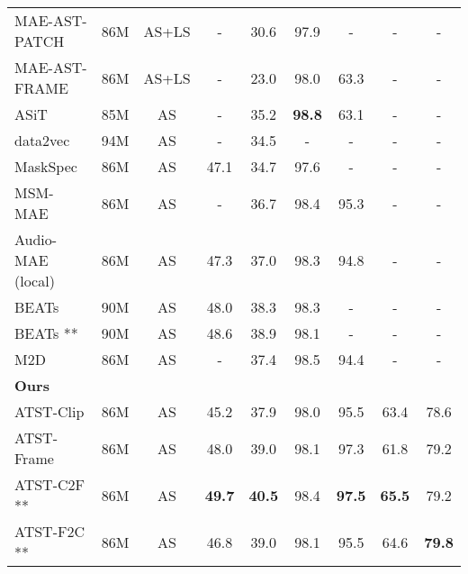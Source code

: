 \begin{table*}[ht]
{\begin{threeparttable}
\begin{tabular}{lcccccccc}
        MAE-AST-PATCH\cite{baade_mae-ast_2022}    &86M & AS+LS   & -               & 30.6 & 97.9   & -   & -  & -    \\
        MAE-AST-FRAME\cite{baade_mae-ast_2022}    &86M & AS+LS   & -               & 23.0 & 98.0   & 63.3   & -  & -   \\
        ASiT\cite{atito_asit_2022}                      &85M & AS      & -               & 35.2 & \textbf{98.8}   & 63.1  & -   & -     \\
        data2vec\cite{baevski_data2vec_2022} & 94M & AS & -&34.5&-&-&- & -\\
        MaskSpec\cite{10095691}  & 86M & AS & 47.1 & 34.7 & 97.6 & - & - & -  \\
        MSM-MAE\cite{niizumi_masked_nodate}  & 86M & AS & - & 36.7 & 98.4 & 95.3 &  -  & - \\

        Audio-MAE (local) \cite{huang_masked_2023} &86M & AS      & 47.3            & 37.0 & 98.3   & 94.8   & - & -     \\
        BEATs \cite{chen_beats_2022}          & 90M& AS      & 48.0            & 38.3 & 98.3   & -      & -   & -  \\        
       
                       BEATs \cite{chen_beats_2022} **          & 90M& AS      & 48.6            & 38.9 & 98.1  & -      & -   & -   \\
        M2D\cite{niizumi_masked_2023}                   & 86M & AS      & -               & 37.4 & 98.5   & 94.4   & -  & -  \\

        \midrule

\multicolumn{5}{l}{\textbf{Ours} } \\                              
        {ATST-Clip }              & 86M         & AS      & 45.2            & 37.9 & 98.0   & 95.5   & 63.4 & 78.6 
        \\
\vspace{1mm}
        {ATST-Frame }             &   86M       & AS      & 48.0            &39.0 & 98.1   & 97.3   & 61.8 & 79.2 \\
        
        


    
         
         {ATST-C2F} ** &86M & AS & \bf{49.7} & \bf{40.5} & 98.4& \bf{97.5} & \bf{65.5} & 79.2  \\
         
        \textcolor{mygray}{ATST-F2C **}  &\textcolor{mygray}{86M} & \textcolor{mygray}{AS} & \textcolor{mygray}{46.8} & \textcolor{mygray}{39.0} & \textcolor{mygray}{98.1}& \textcolor{mygray}{95.5} & \textcolor{mygray}{64.6} & \textcolor{mygray}{\bf{79.8}}  \\
       



\end{tabular}
\end{threeparttable}}
\end{table*}
